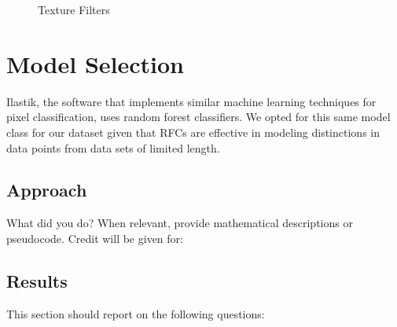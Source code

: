 \documentclass[11pt]{article}
\begin{document}
\begin{figure}[H]
{{{            }
        }\hfill{
        }
    }\caption{Texture Filters}
    \label{fig:texture}
\end{figure}


\section{Model Selection}

Ilastik, the software that implements similar machine learning techniques for pixel classification,
uses random forest classifiers. We opted for this same model class for our dataset given that RFCs
are effective in modeling distinctions in data points from data sets of limited length.

\subsection{Approach}

What did you do? When relevant, provide mathematical descriptions or pseudocode. Credit will be
given for:

\subsection{Results}

This section should report on the following questions: 
\end{document}
